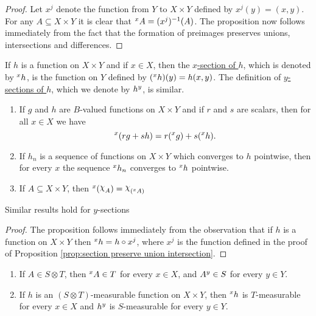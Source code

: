 \begin{proof}
Let $x^j$ denote the function from $Y$ to $X\times Y$ defined by $x^j(y)=(x, y)$. For any $A\subseteq X\times Y$ it is clear that $\xsec{A}{x}=(x^j)^{-1}(A)$. The proposition now follows immediately from the fact that the formation of preimages preserves unions, intersections and differences.
\end{proof}


\begin{definition}
If $h$ is a function on $X\times Y$ and if $x\in X$, then the \underline{$x$-section of $h$}, which is denoted by $\xsec{h}{x}$, is the function on $Y$ defined by $(\xsec{h}{x})(y)=h(x, y)$. The definition of \underline{$y$-sections of $h$}, which we denote by $\ysec{h}{y}$, is similar.
\end{definition}

\begin{proposition}
\label{prop:section basic properties}
\begin{enumerate}
    \item \label{prop:item:section linear}
    If $g$ and $h$ are $B$-valued functions on $X\times Y$ and if $r$ and $s$ are scalars, then for all $x\in X$ we have $$\xsec{(rg+sh)}{x}=r(\xsec{g}{x})+s(\xsec{h}{x}).$$

    \item \label{prop:item:section limit}
    If $h_n$ is a sequence of functions on $X\times Y$ which converges to $h$ pointwise, then for every $x$ the sequence $\xsec{h_n}{x}$ converges to $\xsec{h}{x}$ pointwise.
    
    \item \label{prop:item:section of idf}
    If $A\subseteq X\times Y$, then $\xsec{(\idf{A})}{x}=\idf{(\xsec{A}{x})}$
\end{enumerate}
Similar results hold for $y$-sections
\end{proposition}

\begin{proof}
The proposition follows immediately from the observation that if $h$ is a function on $X\times Y$ then $\xsec{h}{x}=h\circ x^j$, where $x^j$ is the function defined in the proof of Proposition \ref{prop:section preserve union intersection}.
\end{proof}

\begin{proposition}
\begin{enumerate}
    \item \label{prop:item:sections of sets meas}
    If $A\in S\otimes T$, then $\xsec{A}{x}\in T$ for every $x\in X$, and $\ysec{A}{y}\in S$ for every $y\in Y$.
    
    \item If $h$ is an $(S\otimes T)$-measurable function on $X\times Y$, then $\xsec{h}{x}$ is $T$-measurable for every $x\in X$ and $\ysec{h}{y}$ is $S$-measurable for every $y\in Y$.
\end{enumerate}
\end{proposition}


